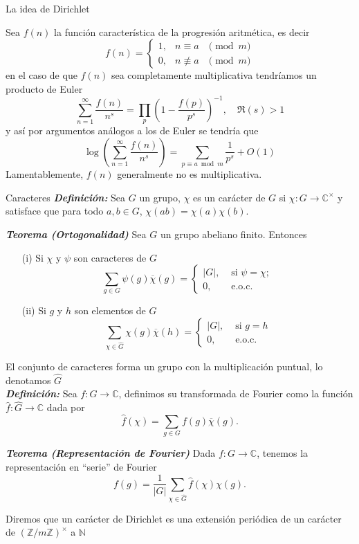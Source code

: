 \documentclass[final]{beamer}
\newcommand\C{\ensuremath{\mathbb{C}}}
\newlength{\colwidth}
\newcommand{\defi}[1]{\textbf{\textsl{#1}}}
\begin{document}
\begin{frame}[t,fragile]
\begin{columns}[t]
\begin{column}{\colwidth}
\begin{alertblock}{La idea de Dirichlet}

Sea $f(n)$ la función característica de la progresión aritmética, es decir
$$
f(n)=\left\{\begin{array}{lll}
1, & n \equiv a & \pmod{m} \\
0, & n \not \equiv a & \pmod{m}
\end{array}\right.
$$
en el caso de que $f(n)$ sea completamente multiplicativa tendríamos un producto de Euler
$$
\sum_{n=1}^{\infty} \frac{f(n)}{n^s}=\prod_p\left(1-\frac{f(p)}{p^s}\right)^{-1}, \quad \Re(s)>1
$$
y así por argumentos análogos a los de Euler se tendría que
$$\log \left(\sum_{n=1}^{\infty} \frac{f(n)}{n^s}\right)=\sum_{p \equiv a\bmod{m}} \frac{1}{p^s}+O(1)$$
Lamentablemente, $f(n)$ generalmente no es multiplicativa.\\
  \end{alertblock}

\begin{block}{Caracteres}
\defi{Definición: }Sea $G$ un grupo, $\chi$ es un carácter de $G$ si $\chi: G\to \C^{\times}$ y satisface que para todo $a,b\in G$, $\chi(ab)=\chi(a)\chi(b)$.

\defi{Teorema (Ortogonalidad) } Sea $G$ un grupo abeliano finito. Entonces
\begin{itemize}
    \item[(i)] Si $\chi$ y $\psi$ son caracteres de $G$
$$
\sum_{g \in G} \psi(g) \overline{\chi}(g)= \begin{cases}|G|, & \text { si } \psi=\chi ; \\ 0, & \text { e.o.c. }\end{cases}
$$
\item[(ii)] Si $g$ y $h$ son elementos de $G$
$$
\sum_{\chi \in \widehat{G}} \chi(g) \overline{\chi}(h)= \begin{cases}|G|, & \text { si } g=h \\ 0, & \text { e.o.c. }\end{cases}
$$
\end{itemize}
El conjunto de caracteres forma un grupo con la multiplicación puntual, lo denotamos $\widehat{G}$\\
\vspace*{0.2cm}
\defi{Definición: }Sea $f: G \rightarrow \mathbb{C}$, definimos su transformada de Fourier como la función $\widehat{f}: \widehat{G} \rightarrow \mathbb{C}$ dada por
$$
\widehat{f}(\chi)=\sum_{g\in G} f(g) \overline{\chi}(g).
$$
\begin{exampleblock}{}
    \defi{Teorema (Representación de Fourier)} Dada $f: G \rightarrow \mathbb{C}$, tenemos la representación en ``serie'' de Fourier
$$
f(g)=\frac{1}{|G|}\sum_{\chi \in \widehat{G}}\widehat{f}(\chi) \chi(g).
$$
\end{exampleblock}
Diremos que un carácter de Dirichlet es una extensión periódica de un carácter de $(\mathbb{Z}/m\mathbb{Z})^{\times}$ a $\mathbb{N}$


\end{block}
\end{column}
\end{columns}
\end{frame}
\end{document}
